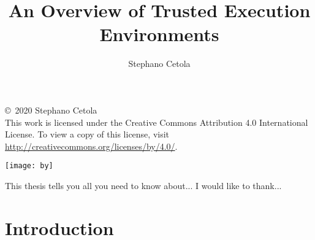 \documentclass[12pt,oneside,letterpaper]{PSUreport}
\begin{document}
\title{An Overview of Trusted Execution Environments}
\subtitle{}
\author{Stephano Cetola}
\submitdate{\today}                                    %

\copyrightfalse
\figurespagefalse
\tablespagefalse
\null\vfill
\begin{center}
        \copyright\ 2020 Stephano Cetola \\
        This work is licensed under the Creative Commons Attribution 4.0 International License. To view a copy of this license, visit \url{http://creativecommons.org/licenses/by/4.0/}.
\end{center}
\begin{center}
\texttt{[image: by]}
\end{center}
\vfill\newpage
 
\beforepreface
{}
This thesis tells you all you need to know about...
I would like to thank...
\afterpreface

\printnoidxglossary[type=\acronymtype]

\glsresetall
\chapter{Introduction}




\end{document}
